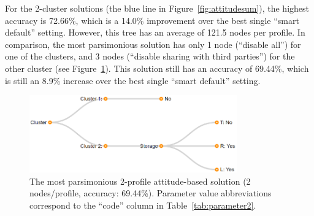 %

For the 2-cluster solutions (the blue line in Figure~\ref{fig:attitudesum}), the highest accuracy is 72.66\%, which is a 14.0\% improvement over the best single ``smart default'' setting. However, this tree has an average of 121.5 nodes per profile. In comparison, the most parsimonious solution has only 1 node (``disable all'') for one of the clusters, and 3 nodes (``disable sharing with third parties'') for the other cluster (see Figure~\ref{fig:att_2_profile}). This solution still has an accuracy of 69.44\%, which is still an 8.9\% increase over the best single ``smart default'' setting.

\begin{figure}
	\centering
	\includegraphics[width=0.8\textwidth]{figures/fit_2_profile001.png}
	\caption{The most parsimonious 2-profile attitude-based solution (2 nodes/profile, accuracy: 69.44\%). Parameter value abbreviations correspond to the ``code'' column in Table~\ref{tab:parameter2}.}
	\label{fig:att_2_profile}
\end{figure}

